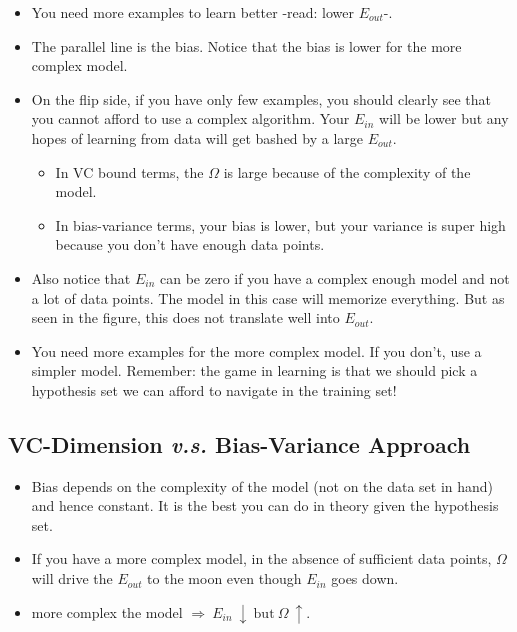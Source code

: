 \documentclass[10pt]{article}
\numberwithin{equation}{section}  %
\begin{document}
\begin{itemize}
    \item You need more examples to learn better -read: lower $E_{out}$-.
    \item The parallel line is the bias. Notice that the bias is lower for the more complex model.
    \item On the flip side, if you have only few examples, you should clearly see that you cannot afford to use a complex algorithm. Your $E_{in}$ will be lower but any hopes of learning from data will get bashed by a large $E_{out}$.
        \begin{itemize}
            \item In VC bound terms, the $\Omega$ is large because of the complexity of the model.
            \item In bias-variance terms, your bias is lower, but your variance is super high because you don't have enough data points.
        \end{itemize}
    \item Also notice that $E_{in}$ can be zero if you have a complex enough model and not a lot of data points. The model in this case will memorize everything. But as seen in the figure, this does not translate well into $E_{out}$.
    \item You need more examples for the more complex model. If you don't, use a simpler model. Remember: the game in learning is that we should pick a hypothesis set we can afford to navigate in the training set!
\end{itemize}


\subsection{VC-Dimension \textit{v.s.} Bias-Variance Approach}

\begin{itemize}
    \item Bias depends on the complexity of the model (not on the data set in hand) and hence constant. It is the best you can do in theory given the hypothesis set.
    \item If you have a more complex model, in the absence of sufficient data points, $\Omega$ will drive the $E_{out}$ to the moon even though $E_{in}$ goes down.
    \item more complex the model $\Longrightarrow\ E_{in}\ \downarrow\ \mathrm{but}\ \Omega\ \uparrow$.
\end{itemize}
\end{document}
